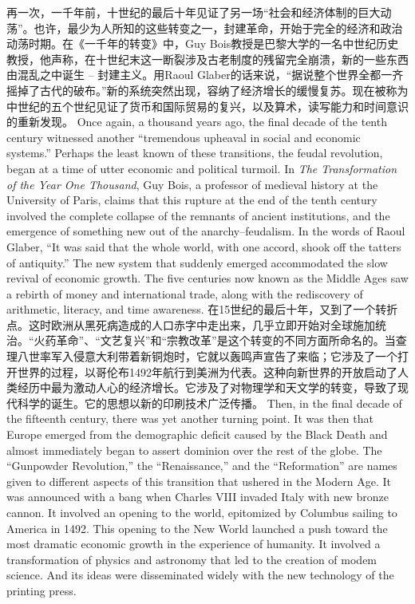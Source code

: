 \begin{paracol}{2}
\switchcolumn*
再一次，一千年前，十世纪的最后十年见证了另一场“社会和经济体制的巨大动荡”。也许，最少为人所知的这些转变之一，封建革命，开始于完全的经济和政治动荡时期。在《一千年的转变》中，Guy Bois教授是巴黎大学的一名中世纪历史教授，他声称，在十世纪末这一断裂涉及古老制度的残留完全崩溃，新的一些东西由混乱之中诞生 -- 封建主义。用Raoul Glaber的话来说，“据说整个世界全都一齐摇掉了古代的破布。”新的系统突然出现，容纳了经济增长的缓慢复苏。现在被称为中世纪的五个世纪见证了货币和国际贸易的复兴，以及算术，读写能力和时间意识的重新发现。
\switchcolumn
Once again, a thousand years ago, the final decade of the tenth century witnessed another ``tremendous upheaval in social and economic systems.'' Perhaps the least known of these transitions, the feudal revolution, began at a time of utter economic and political turmoil. In \emph{The Transformation of the Year One Thousand}, Guy Bois, a professor of medieval history at the University of Paris, claims that this rupture at the end of the tenth century involved the complete collapse of the remnants of ancient institutions, and the emergence of something new out of the anarchy--feudalism. In the words of Raoul Glaber, ``It was said that the whole world, with one accord, shook off the tatters of antiquity.'' The new system that suddenly emerged accommodated the slow revival of economic growth. The five centuries now known as the Middle Ages saw a rebirth of money and international trade, along with the rediscovery of arithmetic, literacy, and time awareness.
\switchcolumn*
在15世纪的最后十年，又到了一个转折点。这时欧洲从黑死病造成的人口赤字中走出来，几乎立即开始对全球施加统治。“火药革命”、“文艺复兴”和“宗教改革”是这个转变的不同方面所命名的。当查理八世率军入侵意大利带着新铜炮时，它就以轰鸣声宣告了来临；它涉及了一个打开世界的过程，以哥伦布1492年航行到美洲为代表。这种向新世界的开放启动了人类经历中最为激动人心的经济增长。它涉及了对物理学和天文学的转变，导致了现代科学的诞生。它的思想以新的印刷技术广泛传播。
\switchcolumn
Then, in the final decade of the fifteenth century, there was yet another turning point. It was then that Europe emerged from the demographic deficit caused by the Black Death and almost immediately began to assert dominion over the rest of the globe. The ``Gunpowder Revolution,'' the ``Renaissance,'' and the ``Reformation'' are names given to different aspects of this transition that ushered in the Modern Age. It was announced with a bang when Charles VIII invaded Italy with new bronze cannon. It involved an opening to the world, epitomized by Columbus sailing to America in 1492. This opening to the New World launched a push toward the most dramatic economic growth in the experience of humanity. It involved a transformation of physics and astronomy that led to the creation of modem science. And its ideas were disseminated widely with the new technology of the printing press.

\end{paracol}
